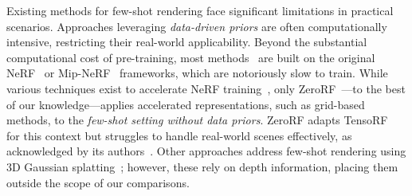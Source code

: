 
Existing methods for few-shot rendering face significant limitations in practical scenarios. Approaches leveraging \textit{data-driven priors} are often computationally intensive, restricting their real-world applicability. Beyond the substantial computational cost of pre-training, most methods~\cite{yang2023freenerf,yu2021pixelnerf,chen2021mvsnerf,wang2023sparsenerf,jain2021putting} are built on the original NeRF~\cite{mildenhall2020nerf} or Mip-NeRF~\cite{barron2021mipnerf} frameworks, which are notoriously slow to train.
While various techniques exist to accelerate NeRF training~\cite{Chen2022ECCV,mueller2022instant,kerbl3Dgaussians}, only ZeroRF~\cite{shi2024zerorf}—to the best of our knowledge—applies accelerated representations, such as grid-based methods, to the \textit{few-shot setting without data priors}. ZeroRF adapts TensoRF~\cite{Chen2022ECCV} for this context but struggles to handle real-world scenes effectively, as acknowledged by its authors~\cite{shi2024zerorf}. Other approaches address few-shot rendering using 3D Gaussian splatting~\cite{li2024dngaussian,zhu2025fsgs}; however, these rely on depth information, placing them outside the scope of our comparisons.



